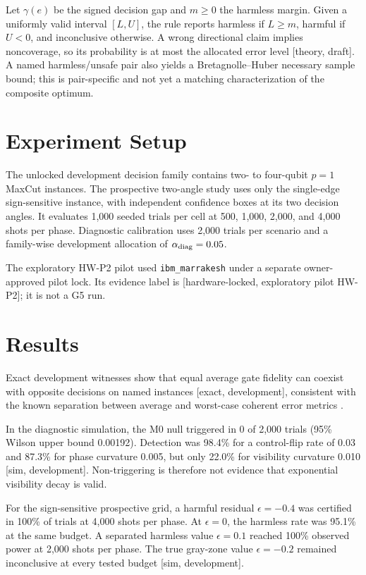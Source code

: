 \documentclass[10pt,twocolumn]{article}
\newcommand{\evidence}[1]{\textnormal{[#1]}}
\begin{document}
Let $\gamma(e)$ be the signed decision gap and $m\geq0$ the harmless margin.
Given a uniformly valid interval $[L,U]$, the rule reports harmless if
$L\geq m$, harmful if $U<0$, and inconclusive otherwise.  A wrong directional
claim implies noncoverage, so its probability is at most the allocated error
level \evidence{theory, draft}.  A named harmless/unsafe pair also yields a
Bretagnolle--Huber necessary sample bound; this is pair-specific and not yet a
matching characterization of the composite optimum.

\section{Experiment Setup}
The unlocked development decision family contains two- to four-qubit
$p=1$ MaxCut instances.  The prospective two-angle study uses only the
single-edge sign-sensitive instance, with independent confidence boxes at its
two decision angles.  It evaluates 1,000 seeded trials per cell at 500, 1,000,
2,000, and 4,000 shots per phase.  Diagnostic calibration uses 2,000 trials per
scenario and a family-wise development allocation of $\alpha_{\rm diag}=0.05$.

The exploratory HW-P2 pilot used \texttt{ibm\_marrakesh} under a separate
owner-approved pilot lock.  Its evidence label is
\evidence{hardware-locked, exploratory pilot HW-P2}; it is not a G5 run.

\section{Results}
Exact development witnesses show that equal average gate fidelity can coexist
with opposite decisions on named instances \evidence{exact, development},
consistent with the known separation between average and worst-case coherent
error metrics \cite{KUENG2016}.

In the diagnostic simulation, the M0 null triggered in 0 of 2,000 trials
(95\% Wilson upper bound 0.00192).  Detection was 98.4\% for a control-flip
rate of 0.03 and 87.3\% for phase curvature 0.005, but only 22.0\% for
visibility curvature 0.010 \evidence{sim, development}.  Non-triggering is
therefore not evidence that exponential visibility decay is valid.

For the sign-sensitive prospective grid, a harmful residual $\epsilon=-0.4$
was certified in 100\% of trials at 4,000 shots per phase.  At $\epsilon=0$,
the harmless rate was 95.1\% at the same budget.  A separated harmless value
$\epsilon=0.1$ reached 100\% observed power at 2,000 shots per phase.  The true
gray-zone value $\epsilon=-0.2$ remained inconclusive at every tested budget
\evidence{sim, development}.
\end{document}
